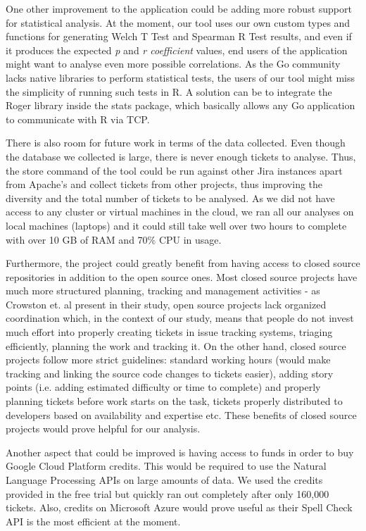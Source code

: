 \documentclass{mpaper}
\begin{document}
One other improvement to the application could be adding more robust support for statistical analysis. At the moment, 
our tool uses our own custom types and functions for generating Welch T Test and Spearman R Test results, and even if 
it produces the expected \emph{p} and \emph{r coefficient} values, end users of the application might want to 
analyse even more possible correlations. As the Go community lacks native libraries to perform statistical tests, 
the users of our tool might miss the simplicity of running such tests in R. A solution can be to integrate the 
Roger library \cite{r_stats} inside the stats package, which basically allows any Go application to communicate with 
R via TCP. 

There is also room for future work in terms of the data collected. Even though the database we collected 
is large, there is never enough tickets to analyse. Thus, the store command of the tool could be run against 
other Jira instances apart from Apache's and collect tickets from other projects, thus improving the diversity 
and the total number of tickets to be analysed. As we did not have access to any cluster or virtual machines in 
the cloud, we ran all our analyses on local machines (laptops) and it could still take well over two hours to complete 
with over 10 GB of RAM and 70\% CPU in usage.

Furthermore, the project could greatly benefit from having access to closed source repositories in addition to the 
open source ones. Most closed source projects have much more structured planning, tracking and management activities - as 
Crowston et. al \cite{crowston2012free} present in their study, open source projects lack organized coordination which,
in the context of our study, means that people do not invest much effort into properly creating tickets in issue tracking 
systems, triaging efficiently, planning the work and tracking it. On the other hand, closed source projects follow 
more strict guidelines: standard working hours (would make tracking and linking the source code changes to tickets easier), 
adding story points (i.e. adding estimated difficulty or time to complete) and properly planning tickets before work 
starts on the task, tickets properly distributed to developers based on availability and expertise etc. These benefits 
of closed source projects would prove helpful for our analysis.

Another aspect that could be improved is having access to funds in order to buy Google Cloud Platform credits. This 
would be required to use the Natural Language Processing APIs on large amounts of data. We used the credits provided 
in the free trial but quickly ran out completely after only 160,000 tickets. Also, credits on Microsoft Azure would 
prove useful as their Spell Check API is the most efficient at the moment.
\end{document}

